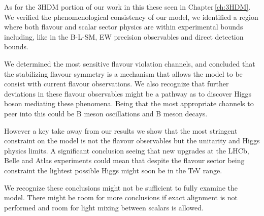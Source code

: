 
As for the 3HDM portion of our work in this these seen in  Chapter\,\ref{ch:3HDM}. 
%
We verified the phenomenological consistency of our model, we identified a region where both flavour and scalar sector physics are within experimental bounds including, like in the B-L-SM, EW precision observables and direct detection bounds.  
%

We determined the most sensitive flavour violation channels, and concluded that the stabilizing flavour symmetry is a mechanism that allows the model to be consist with current flavour observations. 
%
We also recognize that further deviations in these flavour observables might be a pathway as to discover Higgs boson mediating these phenomena. 
%
Being that the most appropriate channels to peer into this could be B meson oscillations and B meson decays.

However a key take away from our results we show that the most stringent constraint on the model is not the flavour observables but the unitarity and Higgs physics limits. 
%
A significant conclusion seeing that new upgrades at the LHCb, Belle and Atlas experiments could mean that despite the flavour sector being constraint the lightest possible Higgs might soon be in the TeV range. 

We recognize these conclusions might not be sufficient to fully examine the model. There might be room for more conclusions if exact alignment is not performed and room for light mixing between scalars is allowed. 
%
%
% 


%
%
%
%



